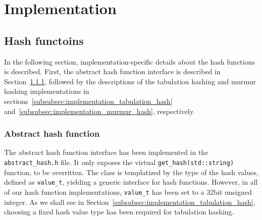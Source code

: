 \documentclass[11pt]{article} %
\begin{document}
\section{Implementation}
\subsection{Hash functoins}
\label{subsec:implementation_hashing_algorithms}
In the following section, implementation-specific details about the hash functions is described. First, the abstract hash function interface is described in Section~\ref{subsubsec:implementation_abstract_hash_function}, followed by the descriptions of the tabulation hashing and murmur hashing implementations in sections~\ref{subsubsec:implementation_tabulation_hash} and~\ref{subsubsec:implementation_murmur_hash}, respectively.
\subsubsection{Abstract hash function}
\label{subsubsec:implementation_abstract_hash_function}
The abstract hash function interface has been implemented in the \verb=abstract_hash.h= file. It only exposes the virtual \verb|get_hash(std::string)| function, to be overritten. The class is templatized by the type of the hash values, defined as \verb|value_t|, yielding a generic interface for hash functions. However, in all of our hash function implementations, \verb|value_t| has been set to a 32bit unsigned integer. As we shall see in Section~\ref{subsubsec:implementation_tabulation_hash}, choosing a fixed hash value type has been required for tabulation hashing.
\end{document}
